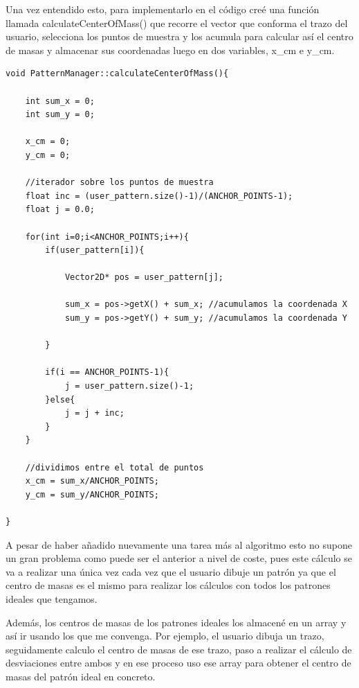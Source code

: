  \vspace{0.5cm}
 
 Una vez entendido esto, para implementarlo en el código creé una función llamada calculateCenterOfMass() que recorre el vector que conforma el trazo del usuario, selecciona los puntos de muestra y los acumula para calcular así el centro de masas y almacenar sus coordenadas luego en dos variables, x\_cm e y\_cm.
 
 \begin{lstlisting}[caption={Cálculo del centro de masas con la función calculateCenterOfMass()}, label={code:calculateCenterOfMass}]
void PatternManager::calculateCenterOfMass(){

	int sum_x = 0;
	int sum_y = 0;

	x_cm = 0;
	y_cm = 0;

	//iterador sobre los puntos de muestra
	float inc = (user_pattern.size()-1)/(ANCHOR_POINTS-1);
	float j = 0.0;

	for(int i=0;i<ANCHOR_POINTS;i++){
		if(user_pattern[i]){

			Vector2D* pos = user_pattern[j];

			sum_x = pos->getX() + sum_x; //acumulamos la coordenada X
			sum_y = pos->getY() + sum_y; //acumulamos la coordenada Y

		}

		if(i == ANCHOR_POINTS-1){
			j = user_pattern.size()-1;
		}else{
			j = j + inc;
		}
	}

	//dividimos entre el total de puntos
	x_cm = sum_x/ANCHOR_POINTS;
	y_cm = sum_y/ANCHOR_POINTS;

}
\end{lstlisting}

 \vspace{0.5cm}

A pesar de haber añadido nuevamente una tarea más al algoritmo esto no supone un gran problema como puede ser el anterior a nivel de coste, pues este cálculo se va a realizar una única vez cada vez que el usuario dibuje un patrón ya que el centro de masas es el mismo para realizar los cálculos con todos los patrones ideales que tengamos.

 \vspace{0.5cm}

Además, los centros de masas de los patrones ideales los almacené en un array y así ir usando los que me convenga. Por ejemplo, el usuario dibuja un trazo, seguidamente calculo el centro de masas de ese trazo, paso a realizar el cálculo de desviaciones entre ambos y en ese proceso uso ese array para obtener el centro de masas del patrón ideal en concreto.

